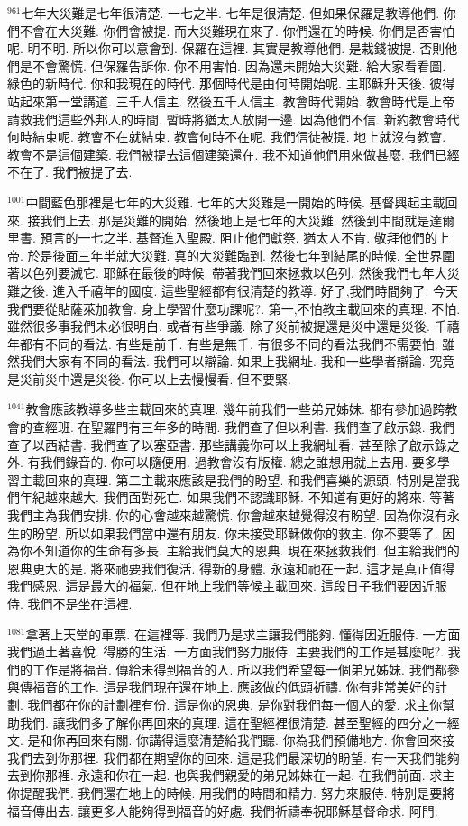\documentclass{book}
\begin{document}
$^{961}$七年大災難是七年很清楚.
一七之半.
七年是很清楚.
但如果保羅是教導他們.
你們不會在大災難.
你們會被提.
而大災難現在來了.
你們還在的時候.
你們是否害怕呢.
明不明.
所以你可以意會到.
保羅在這裡.
其實是教導他們.
是栽錢被提.
否則他們是不會驚慌.
但保羅告訴你.
你不用害怕.
因為還未開始大災難.
給大家看看圖.
綠色的新時代.
你和我現在的時代.
那個時代是由何時開始呢.
主耶穌升天後.
彼得站起來第一堂講道.
三千人信主.
然後五千人信主.
教會時代開始.
教會時代是上帝請救我們這些外邦人的時間.
暫時將猶太人放開一邊.
因為他們不信.
新約教會時代何時結束呢.
教會不在就結束.
教會何時不在呢.
我們信徒被提.
地上就沒有教會.
教會不是這個建築.
我們被提去這個建築還在.
我不知道他們用來做甚麼.
我們已經不在了.
我們被提了去.

$^{1001}$中間藍色那裡是七年的大災難.
七年的大災難是一開始的時候.
基督興起主載回來.
接我們上去.
那是災難的開始.
然後地上是七年的大災難.
然後到中間就是達爾里書.
預言的一七之半.
基督進入聖殿.
阻止他們獻祭.
猶太人不肯.
敬拜他們的上帝.
於是後面三年半就大災難.
真的大災難臨到.
然後七年到結尾的時候.
全世界圍著以色列要滅它.
耶穌在最後的時候.
帶著我們回來拯救以色列.
然後我們七年大災難之後.
進入千禧年的國度.
這些聖經都有很清楚的教導.
好了,我們時間夠了.
今天我們要從貼薩萊加教會.
身上學習什麼功課呢?.
第一,不怕教主載回來的真理.
不怕.
雖然很多事我們未必很明白.
或者有些爭議.
除了災前被提還是災中還是災後.
千禧年都有不同的看法.
有些是前千.
有些是無千.
有很多不同的看法我們不需要怕.
雖然我們大家有不同的看法.
我們可以辯論.
如果上我網址.
我和一些學者辯論.
究竟是災前災中還是災後.
你可以上去慢慢看.
但不要緊.

$^{1041}$教會應該教導多些主載回來的真理.
幾年前我們一些弟兄姊妹.
都有參加過跨教會的查經班.
在聖羅門有三年多的時間.
我們查了但以利書.
我們查了啟示錄.
我們查了以西結書.
我們查了以塞亞書.
那些講義你可以上我網址看.
甚至除了啟示錄之外.
有我們錄音的.
你可以隨便用.
過教會沒有版權.
總之誰想用就上去用.
要多學習主載回來的真理.
第二主載來應該是我們的盼望.
和我們喜樂的源頭.
特別是當我們年紀越來越大.
我們面對死亡.
如果我們不認識耶穌.
不知道有更好的將來.
等著我們主為我們安排.
你的心會越來越驚慌.
你會越來越覺得沒有盼望.
因為你沒有永生的盼望.
所以如果我們當中還有朋友.
你未接受耶穌做你的救主.
你不要等了.
因為你不知道你的生命有多長.
主給我們莫大的恩典.
現在來拯救我們.
但主給我們的恩典更大的是.
將來祂要我們復活.
得新的身體.
永遠和祂在一起.
這才是真正值得我們感恩.
這是最大的福氣.
但在地上我們等候主載回來.
這段日子我們要因近服侍.
我們不是坐在這裡.

$^{1081}$拿著上天堂的車票.
在這裡等.
我們乃是求主讓我們能夠.
懂得因近服侍.
一方面我們過土著喜悅.
得勝的生活.
一方面我們努力服侍.
主要我們的工作是甚麼呢?.
我們的工作是將福音.
傳給未得到福音的人.
所以我們希望每一個弟兄姊妹.
我們都參與傳福音的工作.
這是我們現在還在地上.
應該做的低頭祈禱.
你有非常美好的計劃.
我們都在你的計劃裡有份.
這是你的恩典.
是你對我們每一個人的愛.
求主你幫助我們.
讓我們多了解你再回來的真理.
這在聖經裡很清楚.
甚至聖經的四分之一經文.
是和你再回來有關.
你講得這麼清楚給我們聽.
你為我們預備地方.
你會回來接我們去到你那裡.
我們都在期望你的回來.
這是我們最深切的盼望.
有一天我們能夠去到你那裡.
永遠和你在一起.
也與我們親愛的弟兄姊妹在一起.
在我們前面.
求主你提醒我們.
我們還在地上的時候.
用我們的時間和精力.
努力來服侍.
特別是要將福音傳出去.
讓更多人能夠得到福音的好處.
我們祈禱奉祝耶穌基督命求.
阿門.
\end{document}
